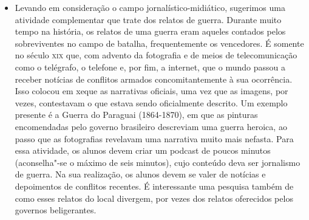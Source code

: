 \documentclass[12pt]{extarticle}
\begin{document}
\begin{itemize}
\begin{comment}
Como já destacado, as práticas que têm lugar nas redes sociais têm
tratamento ampliado. (\textsc{bncc}, p. 494-495)
\end{quote}
\end{comment}

\item Levando em consideração o campo jornalístico-midiático, sugerimos
uma atividade complementar que trate dos relatos de guerra.
Durante muito tempo na história, os relatos de uma guerra eram aqueles
contados pelos sobreviventes no campo de batalha, frequentemente os
vencedores. É somente no século \textsc{xix} que, com advento da fotografia e
de meios de telecomunicação como o telégrafo, o telefone e, por fim, a
internet, que o mundo passou a receber notícias de conflitos armados
concomitantemente à sua ocorrência. Isso colocou em xeque as
narrativas oficiais, uma vez que as imagens, por vezes, contestavam o
que estava sendo oficialmente descrito. Um exemplo presente é a Guerra
do Paraguai (1864-1870), em que as pinturas encomendadas pelo governo
brasileiro descreviam uma guerra heroica, ao passo que as fotografias
revelavam uma narrativa muito mais nefasta. Para essa atividade, os
alunos devem criar um podcast de poucos minutos (aconselha"-se o máximo
de seis minutos), cujo conteúdo deva ser jornalismo de guerra. Na sua
realização, os alunos devem se valer de notícias e depoimentos de
conflitos recentes. É interessante uma pesquisa também de como esses
relatos do local divergem, por vezes dos relatos oferecidos pelos
governos beligerantes.

\begin{comment}
\subsection{Campo artístico"-literário}

\begin{quote}
No campo artístico"-literário busca"-se a ampliação do contato e a
análise mais fundamentada de manifestações culturais e artísticas em
geral. Está em jogo a continuidade da formação do leitor literário e do
desenvolvimento da fruição. A análise contextualizada de produções
artísticas e dos textos literários, com destaque para os clássicos,
intensifica"-se no Ensino Médio. Gêneros e formas diversas de produções
vinculadas à apreciação de obras artísticas e produções culturais
(resenhas, vlogs e podcasts literários, culturais etc.) ou a formas de
apropriação do texto literário, de produções cinematográficas e teatrais
e de outras manifestações artísticas (remidiações, paródias,
estilizações, videominutos, fanfics etc.) continuam a ser considerados
associados a habilidades técnicas e estéticas mais refinadas.


\end{comment}
\end{itemize}
\end{document}

